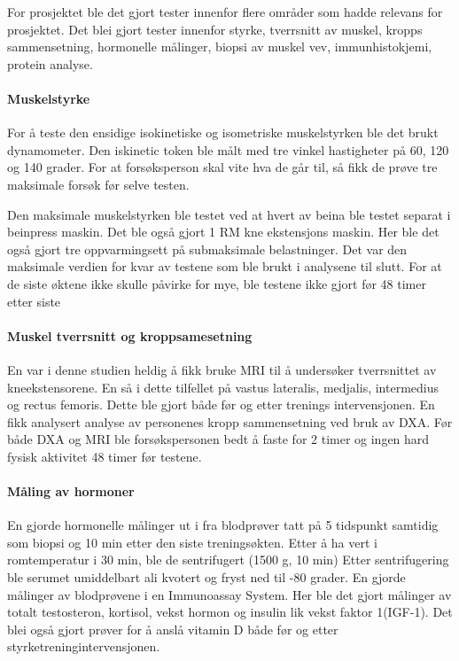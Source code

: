 \documentclass[
  letterpaper,
  DIV=11,
  numbers=noendperiod]{scrartcl}
\let\oldparagraph\paragraph
\renewcommand{\paragraph}[1]{\oldparagraph{#1}\mbox{}}
\begin{document}
For prosjektet ble det gjort tester innenfor flere områder som hadde
relevans for prosjektet. Det blei gjort tester innenfor styrke,
tverrsnitt av muskel, kropps sammensetning, hormonelle målinger, biopsi
av muskel vev, immunhistokjemi, protein analyse.

\hypertarget{muskelstyrke}{%
\paragraph{Muskelstyrke}\label{muskelstyrke}}

For å teste den ensidige isokinetiske og isometriske muskelstyrken ble
det brukt dynamometer. Den iskinetic token ble målt med tre vinkel
hastigheter på 60, 120 og 140 grader. For at forsøksperson skal vite hva
de går til, så fikk de prøve tre maksimale forsøk før selve testen.

Den maksimale muskelstyrken ble testet ved at hvert av beina ble testet
separat i beinpress maskin. Det ble også gjort 1 RM kne ekstensjons
maskin. Her ble det også gjort tre oppvarmingsett på submaksimale
belastninger. Det var den maksimale verdien for kvar av testene som ble
brukt i analysene til slutt. For at de siste øktene ikke skulle påvirke
for mye, ble testene ikke gjort før 48 timer etter siste

\hypertarget{muskel-tverrsnitt-og-kroppsamesetning}{%
\paragraph{Muskel tverrsnitt og
kroppsamesetning}\label{muskel-tverrsnitt-og-kroppsamesetning}}

En var i denne studien heldig å fikk bruke MRI til å undersøker
tverrsnittet av kneekstensorene. En så i dette tilfellet på vastus
lateralis, medjalis, intermedius og rectus femoris. Dette ble gjort både
før og etter trenings intervensjonen. En fikk analysert analyse av
personenes kropp sammensetning ved bruk av DXA. Før både DXA og MRI ble
forsøkspersonen bedt å faste for 2 timer og ingen hard fysisk aktivitet
48 timer før testene.

\hypertarget{muxe5ling-av-hormoner}{%
\paragraph{Måling av hormoner}\label{muxe5ling-av-hormoner}}

En gjorde hormonelle målinger ut i fra blodprøver tatt på 5 tidspunkt
samtidig som biopsi og 10 min etter den siste treningsøkten. Etter å ha
vert i romtemperatur i 30 min, ble de sentrifugert (1500 g, 10 min)
Etter sentrifugering ble serumet umiddelbart ali kvotert og fryst ned
til -80 grader. En gjorde målinger av blodprøvene i en Immunoassay
System. Her ble det gjort målinger av totalt testosteron, kortisol,
vekst hormon og insulin lik vekst faktor 1(IGF-1). Det blei også gjort
prøver for å anslå vitamin D både før og etter
styrketreningintervensjonen.
\end{document}
